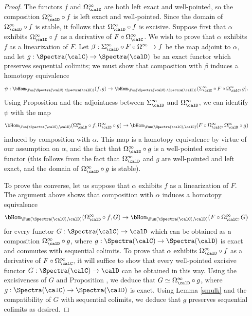 \begin{proof}
The functors $f$ and $\Omega^{\infty}_{\calD}$ are both left exact and well-pointed, so the
composition $\Omega^{\infty}_{\calD} \circ f$ is left exact and well-pointed. Since the domain
of $\Omega^{\infty}_{\calD} \circ f$ is stable, it follows that $\Omega^{\infty}_{\calD} \circ f$
is excisive. Suppose first that $\alpha$ exhibits $\Omega^{\infty}_{\calD} \circ f$
as a derivative of $F \circ \Omega^{\infty}_{\calC}$. We wish to prove that
$\alpha$ exhibits $f$ as a linearization of $F$. Let
$\beta: \Sigma^{\infty}_{\calD} \circ F \circ \Omega^{\infty} \rightarrow f$ be the
map adjoint to $\alpha$, and let $g: \Spectra(\calC) \rightarrow \Spectra(\calD)$ be
an exact functor which preserves sequential colimits; we must show that
composition with $\beta$ induces a homotopy equivalence
$$ \psi: \bHom_{ \Fun( \Spectra(\calC), \Spectra(\calD))}(f,g) \rightarrow
\bHom_{ \Fun(\Spectra(\calC), \Spectra(\calD))}( \Sigma^{\infty}_{\calD}
\circ F \circ \Omega^{\infty}_{\calC}, g).$$
Using Proposition  and the adjointness between
$\Sigma^{\infty}_{\calD}$ and $\Omega^{\infty}_{\calD}$, we can identify
$\psi$ with the map
$$ \bHom_{ \Fun( \Spectra(\calC), \calD)}( \Omega^{\infty}_{\calD} \circ f,
\Omega^{\infty}_{\calD} \circ g) \rightarrow \bHom_{ \Fun( \Spectra(\calC), \calD)}(
F \circ \Omega^{\infty}_{\calC}, \Omega^{\infty}_{\calD} \circ g)$$
induced by composition with $\alpha$. This map is a homotopy equivalence
by virtue of our assumption on $\alpha$, and the fact that $\Omega^{\infty}_{\calD} \circ g$
is a well-pointed excisive functor (this follows from the fact that $\Omega^{\infty}_{\calD}$ and $g$
are well-pointed and left exact, and the domain of $\Omega^{\infty}_{\calD} \circ g$ is stable).

To prove the converse, let us suppose that $\alpha$ exhibits $f$ as a linearization of $F$.
The argument above shows that composition with $\alpha$ induces a homotopy
equivalence 
$$ \bHom_{ \Fun( \Spectra(\calC), \calD)}( \Omega^{\infty}_{\calD} \circ f,
G) \rightarrow \bHom_{ \Fun( \Spectra(\calC), \calD)}(
F \circ \Omega^{\infty}_{\calC}, G)$$
for every functor $G: \Spectra(\calC) \rightarrow \calD$ which can be obtained as a composition
$\Omega^{\infty}_{\calD} \circ g$, where $g: \Spectra(\calC) \rightarrow \Spectra(\calD)$
is exact and commutes with sequential colimits. To prove that $\alpha$
exhibits $\Omega^{\infty}_{\calD} \circ f$ as a derivative of $F \circ \Omega^{\infty}_{\calC}$,
it will suffice to show that every well-pointed excisive functor $G: \Spectra(\calC) \rightarrow \calD$
can be obtained in this way. Using the excisiveness of $G$ and Proposition ,
we deduce that $G \simeq \Omega^{\infty}_{\calD} \circ g$, where $g: \Spectra(\calC) \rightarrow
\Spectra(\calD)$ is exact. Using Lemma \ref{smulk} and the compatibility of $G$
with sequential colimits, we deduce that $g$ preserves sequential colimits as desired.
\end{proof}

